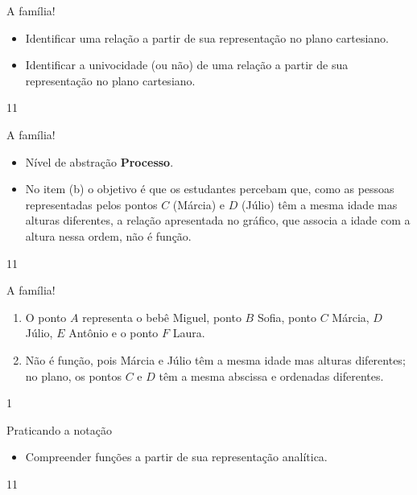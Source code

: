 \begin{objectives}{A família!}
{
\begin{itemize}

\item Identificar uma relação a partir de sua representação no plano cartesiano.

\item Identificar a univocidade (ou não) de uma relação a partir de sua representação no plano cartesiano.

\end{itemize}

}{1}{1}
\end{objectives}
\marginpar{\vspace{-2em}}
\begin{sugestions}{A família!}
{
\begin{itemize}
\item Nível de abstração \textbf{Processo}.

\item No item (b) o objetivo é que os estudantes percebam que, como as pessoas representadas pelos pontos $C$ (Márcia) e $D$ (Júlio) têm a mesma idade mas alturas diferentes, a relação apresentada no gráfico, que associa a idade com a altura nessa ordem, não é função.
\end{itemize}
}{1}{1}
\end{sugestions}
\begin{answer}{A família!}
{
\begin{enumerate}
\item O ponto $A$ representa o bebê Miguel, ponto $B$ Sofia, ponto $C$ Márcia, $D$ Júlio, $E$ Antônio e o ponto $F$ Laura.

\item Não é função, pois Márcia e Júlio têm a mesma idade mas alturas diferentes; no plano, os pontos $C$ e $D$ têm a mesma abscissa e ordenadas diferentes.

\end{enumerate}
}{1}
\end{answer}
\clearmargin
\begin{objectives}{Praticando a notação}
{
\begin{itemize}

\item Compreender funções a partir de sua representação analítica.


\end{itemize}
}{1}{1}
\end{objectives}
